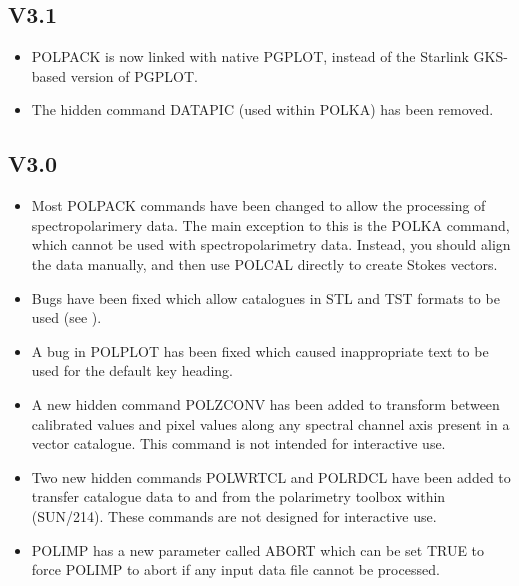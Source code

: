 \documentclass[twoside,11pt]{starlink}
\begin{document}
\subsection{V3.1}

\begin{itemize}
\item POLPACK is now linked with native PGPLOT, instead of the Starlink
GKS-based version of PGPLOT.

\item The hidden command DATAPIC (used within POLKA) has been removed.

\end{itemize}

\subsection{V3.0}

\begin{itemize}
\item Most POLPACK commands have been changed to allow the processing of
spectropolarimery data. The main exception to this is the POLKA command,
which cannot be used with spectropolarimetry data. Instead, you should
align the data manually, and then use POLCAL directly to create Stokes
vectors.

\item Bugs have been fixed which allow catalogues in STL and TST formats
to be used (see ).

\item A bug in POLPLOT has been fixed which caused inappropriate
text to be used for the default key heading.

\item A new hidden command POLZCONV has been added to transform between
calibrated values and pixel values along any spectral channel axis
present in a vector catalogue. This command is not intended for
interactive use.

\item Two new hidden commands POLWRTCL and POLRDCL have been added to
transfer catalogue data to and from the polarimetry toolbox within
 (SUN/214). These commands are not
designed for interactive use.

\item POLIMP has a new parameter called ABORT which can be set TRUE
to force POLIMP to abort if any input data file cannot be processed.

\end{itemize}
\end{document}
